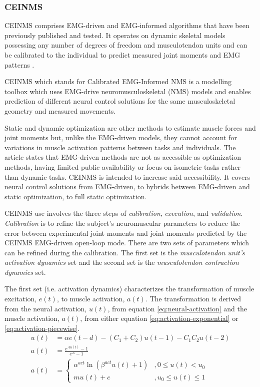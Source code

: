 \subsubsection{CEINMS}
CEINMS comprises \ac{EMG}-driven and \ac{EMG}-informed algorithms that have been previously published and tested. 
It operates on dynamic skeletal models possessing any number of degrees of freedom and musculotendon units and can be calibrated to the individual to predict measured joint moments and \ac{EMG} patterns \cite{Pizzolato2015}.

CEINMS which stands for Calibrated \ac{EMG}-Informed NMS is a modelling toolbox which uses \ac{EMG}-drive neuromusculoskeletal (NMS) models and enables prediction of different neural control solutions for the same musculoskeletal geometry and measured movements. 

Static and dynamic optimization are other methods to estimate muscle forces and joint moments but, unlike the \ac{EMG}-driven models, they cannot account for variations in muscle activation patterns between tasks and individuals.
The article states that \ac{EMG}-driven methods are not as accessible as optimization methods, having limited public availability or focus on isometric tasks rather than dynamic tasks. 
CEINMS is intended to increase said accessibility. 
It covers neural control solutions from \ac{EMG}-driven, to hybrids between \ac{EMG}-driven and static optimization, to full static optimization.

CEINMS use involves the three steps of \textit{calibration}, \textit{execution}, and \textit{validation}. \textit{Calibration} is to refine the subject's neuromuscular parameters to reduce the error between experimental joint moments and joint moments predicted by the CEINMS \ac{EMG}-driven open-loop mode. There are two sets of parameters which can be refined during the calibration. The first set is the \textit{musculotendon unit's activation dynamics} set and the second set is the \textit{musculotendon contraction dynamics} set. 

The first set (i.e. activation dynamics) characterizes the transformation of muscle excitation, $e(t)$, to muscle activation, $a(t)$. The transformation is derived from the neural activation, $u(t)$, from equation \ref{eq:neural-activation} and the muscle activation, $a(t)$, from either equation \ref{eq:activation-exponential} or \ref{eq:activation-piecewise}.
\begin{align}
\label{eq:neural-activation}
    u(t) &= \alpha e(t-d) - (C_1 + C_2)u(t-1) - C_1 C_2 u(t-2) \\
\label{eq:activation-exponential}
    a(t) &= \frac{e^{Au(t)} - 1}{e^A - 1}\\
\label{eq:activation-piecewise}
    a(t) &= \begin{cases}
        \alpha^{act}\ln \left( \beta^{act}u(t)+1 \right) &, 0\leq u(t) < u_0\\
        mu(t) + c &, u_0 \leq u(t) \leq 1
    \end{cases}
\end{align}

